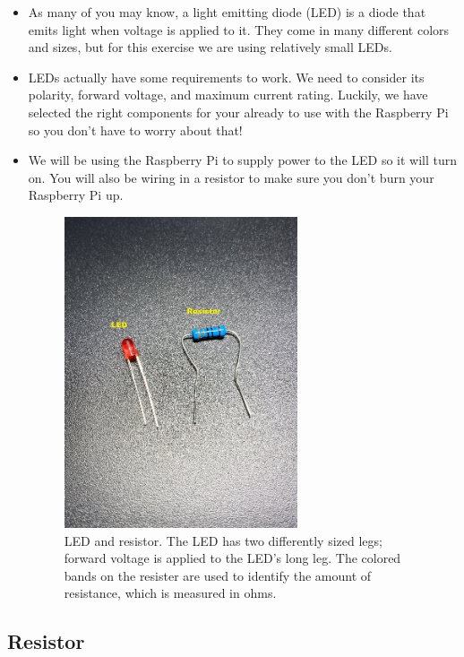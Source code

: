 \documentclass{article}\usepackage[]{graphicx}\usepackage[]{color}
\begin{document}
\begin{itemize}
\item As many of you may know, a light emitting diode (LED) is a diode that emits light when voltage is applied to it. They come in many different colors and sizes, but for this exercise we are using relatively small LEDs.
\item LEDs actually have some requirements to work. We need to consider its polarity, forward voltage, and maximum current rating. Luckily, we have selected the right components for your already to use with the Raspberry Pi so you don't have to worry about that!
\item We will be using the Raspberry Pi to supply power to the LED so it will turn on. You will also be wiring in a resistor to make sure you don't burn your Raspberry Pi up.
\begin{figure}[h]
\begin{center}
\includegraphics[width=0.65\textwidth]{ledres}
\caption{LED and resistor. The LED has two differently sized legs; forward voltage is applied to the LED's long leg. The colored bands on the resister are used to identify the amount of resistance, which is measured in ohms.\label{fig:ledres}}
\end{center}
\end{figure}
\end{itemize}

\subsection{Resistor}
\end{document}
